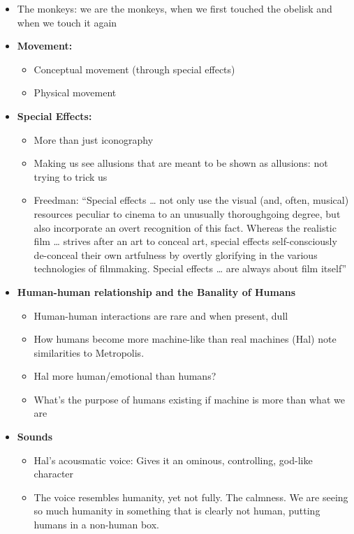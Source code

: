 \documentclass[11pt,fleqn]{book} %
\begin{document}
\begin{itemize}
    \item The monkeys: we are the monkeys, when we first touched the obelisk and when we touch it again
    \item \textbf{Movement:}
    \begin{itemize}
        \item Conceptual movement (through special effects)
        \item Physical movement
    \end{itemize}
    \item \textbf{Special Effects:}
    \begin{itemize}
        \item More than just iconography
        \item Making us see allusions that are meant to be shown as allusions: not trying to trick us
        \item Freedman: \enquote{Special effects … not only use the visual
(and, often, musical) resources peculiar
to cinema to an unusually
thoroughgoing degree, but also
incorporate an overt recognition of this
fact. Whereas the realistic film … strives
after an art to conceal art, special
effects self-consciously de-conceal their
own artfulness by overtly glorifying in
the various technologies of filmmaking.
Special effects … are always about film
itself}
    \end{itemize}
    \item \textbf{Human-human relationship and the Banality of Humans}
    \begin{itemize}
        \item Human-human interactions are rare and when present, dull
        \item How humans become more machine-like than real machines (Hal) note similarities to Metropolis. 
        \item Hal more human/emotional than humans? 
        \item What's the purpose of humans existing if machine is more than what we are
    \end{itemize}
    \item \textbf{Sounds}
    \begin{itemize}
        \item Hal's acousmatic voice: Gives it an ominous, controlling, god-like character
        \item The voice resembles humanity, yet not fully. The calmness. We are seeing so much humanity in something that is clearly not human, putting humans in a non-human box. 

\end{itemize}
\end{itemize}
\end{document}

